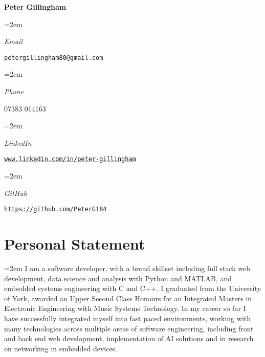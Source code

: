 \documentclass[12pt]{article} %
\newlength{\spacebox}
\newcommand{\sepspace}{\vspace*{1em}}
\newcommand{\name}[1]{
\Huge %
\fontfamily{phv}\selectfont %
\begin{center} \textbf{#1} \end{center}\par
\normalsize\normalfont}
\newcommand{\info}[2]{
    \noindent\hangindent=2em\hangafter=0
    \parbox{\spacebox}{%
    \textsl{#1}} %
    #2 \par} %
\newcommand{\personalstatement}[1]{
  \vspace*{0.5em}
  \noindent\hangindent=2em\hangafter=0 \small #1 
\normalsize \par}
\begin{document}
\name{Peter Gillingham}
\vspace*{-10pt}

\sepspace
\info{Email}{\texttt{petergillingham80@gmail.com}}
\info{Phone}{07383 014163}
\info{LinkedIn}{\texttt{\url{www.linkedin.com/in/peter-gillingham}}}
\info{GitHub}{\texttt{\url{https://github.com/PeterG184}}}

\section*{Personal Statement}
\personalstatement{I am a software developer, with a broad skillset including full stack web development, data science and analysis with Python and MATLAB, and embedded systems engineering with C and C++. I graduated from the University of York, awarded an Upper Second Class Honours for an Integrated Masters in Electronic Engineering with Music Systems Technology. In my career so far I have successfully integrated myself into fast paced environments, working with many technologies across multiple areas of software engineering, including front and back end web development, implementation of AI solutions and in research on networking in embedded devices.}

\end{document}
